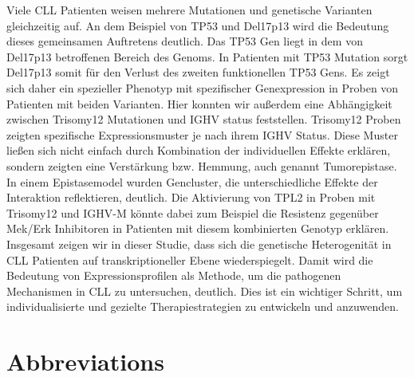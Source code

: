 \documentclass[a4paper,fontsize=12pt,headsepline]{scrartcl}
\begin{document}
Viele CLL Patienten weisen mehrere Mutationen und genetische Varianten gleichzeitig auf. An dem Beispiel von TP53 und Del17p13 wird die Bedeutung dieses gemeinsamen Auftretens deutlich. Das TP53 Gen liegt in dem von Del17p13 betroffenen Bereich des Genoms. In Patienten mit TP53 Mutation sorgt Del17p13 somit für den Verlust des zweiten funktionellen TP53 Gens. Es zeigt sich daher ein spezieller Phenotyp mit spezifischer Genexpression in Proben von Patienten mit beiden Varianten. Hier konnten wir außerdem eine Abhängigkeit zwischen Trisomy12 Mutationen und IGHV status feststellen. Trisomy12 Proben zeigten spezifische Expressionsmuster je nach ihrem IGHV Status. Diese Muster ließen sich nicht einfach durch Kombination der individuellen Effekte erklären, sondern zeigten eine Verstärkung bzw. Hemmung, auch genannt Tumorepistase. In einem Epistasemodel wurden Gencluster, die unterschiedliche Effekte der Interaktion reflektieren, deutlich. Die Aktivierung von TPL2 in Proben mit Trisomy12 und IGHV-M könnte dabei zum Beispiel die Resistenz gegenüber Mek/Erk Inhibitoren in Patienten mit diesem kombinierten Genotyp erklären. \\

Insgesamt zeigen wir in dieser Studie, dass sich die genetische Heterogenität in CLL Patienten auf transkriptioneller Ebene wiederspiegelt. Damit wird die Bedeutung von Expressionsprofilen als Methode, um die pathogenen Mechanismen in CLL zu untersuchen, deutlich. Dies ist ein wichtiger Schritt, um individualisierte und gezielte Therapiestrategien zu entwickeln und anzuwenden.  
   

 





\cleardoublepage

\clearpage
\section*{Abbreviations}
{\large
	\noindent	
	
}
\cleardoublepage
\end{document}
